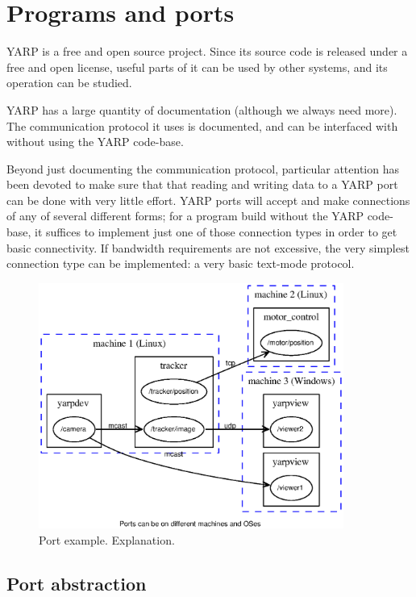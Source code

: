 
\section{Programs and ports}

YARP is a free and open source project.  Since its source code is
released under a free and open license, useful parts of it can be used
by other systems, and its operation can be studied.

YARP has a large quantity of documentation (although we always need
more).  The communication protocol it uses is documented, and can be
interfaced with without using the YARP code-base.

Beyond just documenting the communication protocol, particular attention
has been devoted to make sure that that reading and writing data to a
YARP port can be done with very little effort.  YARP ports will 
accept and make connections of any of several different forms;
for a program build without the YARP code-base, it suffices
to implement just one of those connection types in order to
get basic connectivity.  If bandwidth requirements are not
excessive, the very simplest connection type can be implemented:
a very basic text-mode protocol.



\begin{figure}[t]
\centerline{
\includegraphics[width=10cm]{fig-ports}
}
\caption{
%
Port example.  Explanation.
%
}
\end{figure}





\subsection{Port abstraction}

